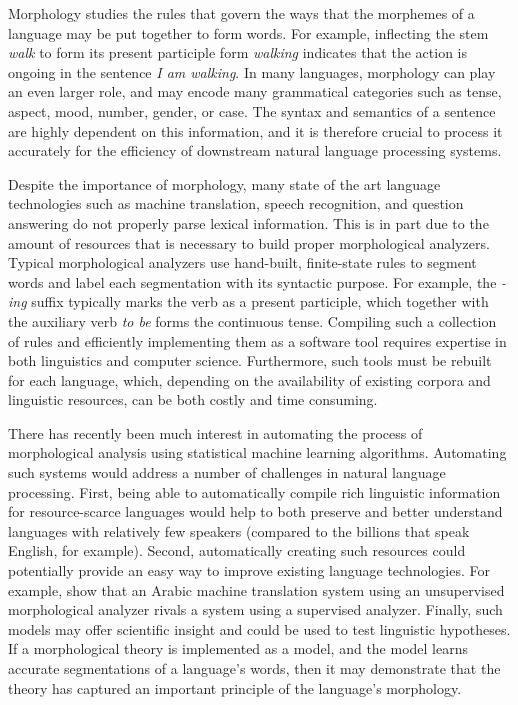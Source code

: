 Morphology studies the rules that govern the ways that the morphemes
of a language may be put together to form words. For example,
inflecting the stem \textit{walk} to form its present participle form
\textit{walking} indicates that the action is ongoing in the sentence
\textit{I am walking}. In many languages, morphology can play an even
larger role, and may encode many grammatical categories such as
tense, aspect, mood, number, gender, or case. The syntax and semantics
of a sentence are highly dependent on this information, and it is
therefore crucial to process it accurately for the efficiency
of downstream natural language processing systems.

Despite the importance of morphology, many state of the art language
technologies such as machine translation, speech recognition, and
question answering do not properly parse lexical information. This is
in part due to the amount of resources that is necessary to build
proper morphological analyzers. Typical morphological analyzers use
hand-built, finite-state rules to segment words and label each
segmentation with its syntactic purpose. For example, the
\textit{-ing} suffix typically marks the verb as a present participle,
which together with the auxiliary verb \textit{to be} forms the
continuous tense. Compiling such a collection of rules and efficiently
implementing them as a software tool requires expertise in both
linguistics and computer science. Furthermore, such tools must be
rebuilt for each language, which, depending on the availability of
existing corpora and linguistic resources, can be both costly and time
consuming.

There has recently been much interest in automating the process of
morphological analysis using statistical machine learning
algorithms. Automating such systems would address a number of
challenges in natural language processing. First, being able to
automatically compile rich linguistic information for resource-scarce
languages would help to both preserve and better understand languages
with relatively few speakers (compared to the billions that speak
English, for example). Second, automatically creating such resources
could potentially provide an easy way to improve existing language
technologies. For example, \cite{stallard2012} show that an Arabic
machine translation system using an unsupervised morphological
analyzer rivals a system using a supervised analyzer. Finally, such
models may offer scientific insight and could be used to test
linguistic hypotheses. If a morphological theory is implemented as a
model, and the model learns accurate segmentations of a language's
words, then it may demonstrate that the theory has captured an
important principle of the language's morphology.

